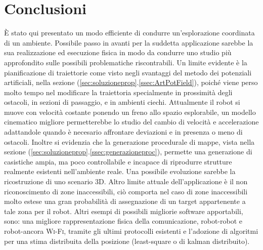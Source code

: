 \section{Conclusioni}
\label{sec:conclusioni}
È stato qui presentato un modo efficiente di condurre un'esplorazione coordinata
di un ambiente.
Possibile passo in avanti per la suddetta applicazione sarebbe la sua
realizzazione ed esecuzione fisica in modo da condurre uno studio più
approfondito sulle possibili problematiche riscontrabili.
Un limite evidente è la pianificazione di traiettorie come visto negli svantaggi
del metodo dei potenziali artificiali, nella sezione
(\ref{sec:soluzioneprop}.\ref{ssec:ArtPotField}), poiché viene perso molto tempo
nel modificare la traiettoria specialmente in prossimità degli ostacoli,
in sezioni di passaggio, e in ambienti ciechi.
Attualmente il robot si muove con velocità costante ponendo un freno allo spazio
esplorabile, un modello cinematico migliore permetterebbe lo studio del cambio
di velocità e accelerazione adattandole quando è necesario affrontare
deviazioni e in presenza o meno di ostacoli.
Inoltre si evidenzia che la generazione procedurale di mappe, vista nella
sezione (\ref{sec:soluzioneprop}.\ref{ssec:generazioneproc}), permette una
generazione di casistiche ampia, ma poco controllabile e incapace di riprodurre
strutture realmente esistenti nell'ambiente reale.
Una possibile evoluzione sarebbe la ricostruzione di uno scenario 3D.
Altro limite attuale dell'applicazione è il non riconoscimento di zone
inaccessibili, ciò comporta nel caso di zone inaccessibili molto estese una gran
probabilità di assegnazione di un target appartenente a tale zona per il robot.
Altri esempi di possibili migliorie software apportabili, sono: una migliore
rappresentazione fisica della comunicazione, robot-robot e robot-ancora
\textsc{Wi-Fi}, tramite gli ultimi protocolli esistenti e l'adozione di algoritmi
per una stima distribuita della posizione (least-square o di kalman distribuito).
